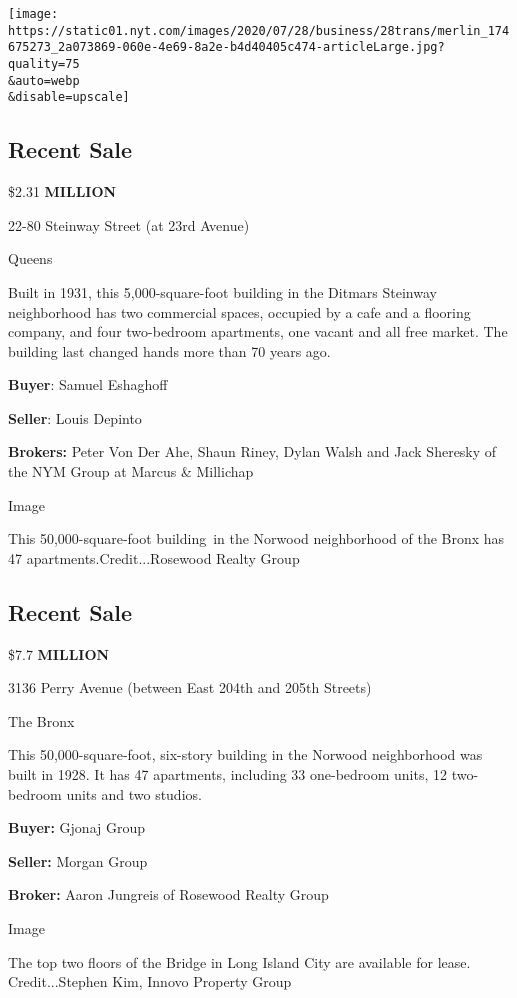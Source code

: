 \texttt{[image: https://static01.nyt.com/images/2020/07/28/business/28trans/merlin\_174675273\_2a073869-060e-4e69-8a2e-b4d40405c474-articleLarge.jpg?quality=75\\\&auto=webp\\\&disable=upscale]}

\hypertarget{recent-sale}{%
\subsection{Recent Sale}\label{recent-sale}}

\$2.31 \textbf{MILLION}

22-80 Steinway Street (at 23rd Avenue)

Queens

Built in 1931, this 5,000-square-foot building in the Ditmars Steinway
neighborhood has two commercial spaces, occupied by a cafe and a
flooring company, and four two-bedroom apartments, one vacant and all
free market. The building last changed hands more than 70 years ago.

\textbf{Buyer}: Samuel Eshaghoff

\textbf{Seller}: Louis Depinto

\textbf{Brokers:} Peter Von Der Ahe, Shaun Riney, Dylan Walsh and Jack
Sheresky of the NYM Group at Marcus \& Millichap

Image

This 50,000-square-foot building~in the Norwood neighborhood of the
Bronx has 47 apartments.Credit...Rosewood Realty Group

\hypertarget{recent-sale-1}{%
\subsection{Recent Sale}\label{recent-sale-1}}

\$7.7 \textbf{MILLION}

3136 Perry Avenue (between East 204th and 205th Streets)

The Bronx

This 50,000-square-foot, six-story building in the Norwood neighborhood
was built in 1928. It has 47 apartments, including 33 one-bedroom units,
12 two-bedroom units and two studios.

\textbf{Buyer:} Gjonaj Group

\textbf{Seller:} Morgan Group

\textbf{Broker:} Aaron Jungreis of Rosewood Realty Group

Image

The top two floors of the Bridge in Long Island City are available for
lease. Credit...Stephen Kim, Innovo Property Group

